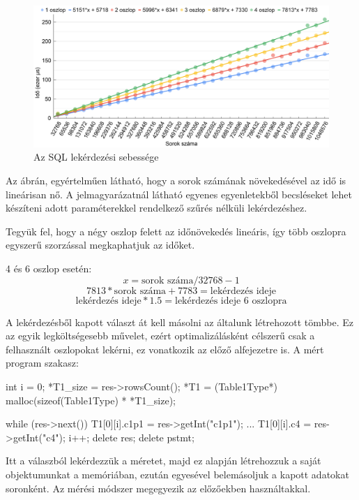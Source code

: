 \begin{figure}[h!]
\centering
\includegraphics[width=\textwidth]{images/graph/sqlquery.png}
\caption{Az SQL lekérdezési sebessége}
\label{fig:schema}
\end{figure}
Az ábrán, egyértelműen látható, hogy a sorok számának növekedésével az idő is lineárisan nő.
A jelmagyarázatnál látható egyenes egyenletekből becsléseket lehet készíteni adott paraméterekkel rendelkező szűrés nélküli lekérdezéshez. 

Tegyük fel, hogy a négy oszlop felett az időnövekedés lineáris, így több oszlopra egyszerű szorzással megkaphatjuk az időket.

4 és 6 oszlop esetén:
$$ x = \text{sorok száma}/32768 - 1 $$
$$ 7813 * \text{sorok száma} + 7783 = \text{lekérdezés ideje}$$
$$ \text{lekérdezés ideje} * 1.5 = \text{lekérdezés ideje 6 oszlopra} $$


A lekérdezésből kapott választ át kell másolni az általunk létrehozott tömbbe. Ez az egyik legköltségesebb művelet, ezért optimalizálásként célszerű csak a felhasznált oszlopokat lekérni, ez vonatkozik az előző alfejezetre is.
A mért program szakasz:
\begin{python}
int i = 0;
*T1_size = res->rowsCount();
*T1 = (Table1Type*) malloc(sizeof(Table1Type) * *T1_size);

while (res->next())
 {
	T1[0][i].c1p1 = res->getInt("c1p1");
	... 
	T1[0][i].c4 = res->getInt("c4");
	i++;
 }
delete res;
delete pstmt;
\end{python}

Itt a válaszból lekérdezzük a méretet, majd ez alapján létrehozzuk a saját objektumunkat a memóriában, ezután egyesével belemásoljuk 
a kapott adatokat soronként.
Az mérési módszer megegyezik az előzőekben használtakkal.



